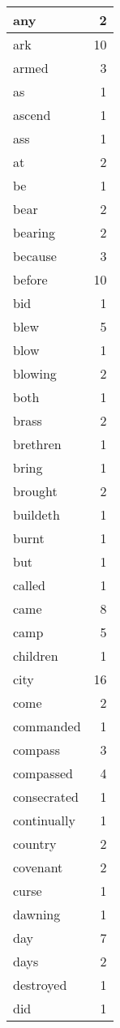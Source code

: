 \begin{center}
\begin{longtable}{l|r}
any & 2 \\ \hline
ark & 10 \\ \hline
armed & 3 \\ \hline
as & 1 \\ \hline
ascend & 1 \\ \hline
ass & 1 \\ \hline
at & 2 \\ \hline
be & 1 \\ \hline
bear & 2 \\ \hline
bearing & 2 \\ \hline
because & 3 \\ \hline
before & 10 \\ \hline
bid & 1 \\ \hline
blew & 5 \\ \hline
blow & 1 \\ \hline
blowing & 2 \\ \hline
both & 1 \\ \hline
brass & 2 \\ \hline
brethren & 1 \\ \hline
bring & 1 \\ \hline
brought & 2 \\ \hline
buildeth & 1 \\ \hline
burnt & 1 \\ \hline
but & 1 \\ \hline
called & 1 \\ \hline
came & 8 \\ \hline
camp & 5 \\ \hline
children & 1 \\ \hline
city & 16 \\ \hline
come & 2 \\ \hline
commanded & 1 \\ \hline
compass & 3 \\ \hline
compassed & 4 \\ \hline
consecrated & 1 \\ \hline
continually & 1 \\ \hline
country & 2 \\ \hline
covenant & 2 \\ \hline
curse & 1 \\ \hline
dawning & 1 \\ \hline
day & 7 \\ \hline
days & 2 \\ \hline
destroyed & 1 \\ \hline
did & 1 \\ \hline

\end{longtable}
\end{center}
